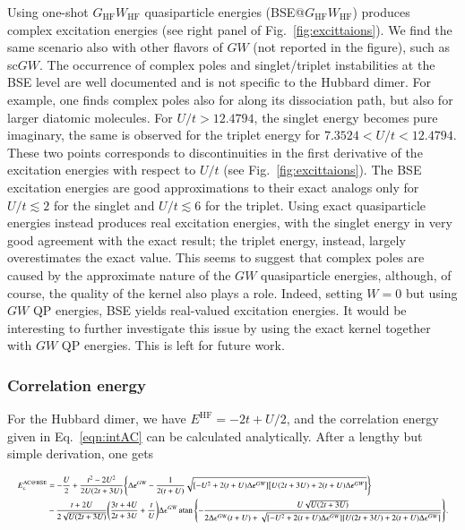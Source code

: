 \documentclass[aps,prb,reprint,superscriptaddress]{revtex4-1}
\makeatletter
\newcommand{\EHF}{E^\text{HF}}
\newcommand{\EcACBSE}{E_\text{c}^\text{AC@BSE}}
\newcommand{\eps}{\epsilon}
\makeatother
\begin{document}
Using one-shot $G_{\text{HF}}W_{\text{HF}}$ quasiparticle energies (BSE@$G_{\text{HF}}W_{\text{HF}}$) produces complex excitation energies (see right panel of Fig.~\ref{fig:excittaions}). We find the same scenario also with other flavors of $GW$ (not reported in the figure), such as sc$GW$.  The occurrence of complex poles and singlet/triplet instabilities at the BSE level are well documented \citep{Holzer_2018b,Blase_2020,Loos_2020e} and is not specific to the Hubbard dimer. For example, one finds complex poles also for  along its dissociation path, \citep{Li_2021a} but also for larger diatomic molecules. \citep{Loos_2020e}
For $U/t>12.4794$, the singlet energy becomes pure imaginary, the same is observed for the triplet energy for $7.3524<U/t<12.4794$. These two points corresponds to discontinuities in the first derivative of the excitation energies with respect to $U/t$ (see Fig.~\ref{fig:excittaions}).
The BSE excitation energies are good approximations to their exact analogs only for $U/t\lesssim 2$ for the singlet and $U/t\lesssim 6$ for the triplet.
Using exact quasiparticle energies instead produces real excitation energies, with the singlet energy in very good agreement with the exact result; the triplet energy, instead, largely overestimates the exact value. 
This seems to suggest that complex poles are caused by the approximate nature of the $GW$ quasiparticle energies, although, of course, the quality of the kernel also plays a role. Indeed, setting $W=0$ but using $GW$ QP energies, BSE yields real-valued excitation energies. It would be interesting to further investigate this issue by using the exact kernel together with $GW$ QP energies. This is left for future work.


\subsubsection{Correlation energy}
For the Hubbard dimer, we have $\EHF = -2t+U/2$, and the correlation energy given in Eq.~\eqref{eqn:intAC} can be calculated analytically. 
After a lengthy but simple derivation, one gets
\begin{widetext}
\begin{equation}
\resizebox{1\textwidth}{!}{$ \begin{split}
	\EcACBSE 
	& = - \frac{U}{2} 
	+ \frac{t^2-2U^2}{2U(2t+3U)} \qty{ \Delta\eps^{GW}-\frac{1}{2(t+U)}\sqrt{[-U^2+2(t+U)\Delta\eps^{GW}] \qty[U(2t+3U)+2(t+U)\Delta\eps^{GW}]} }\nonumber	\\
	& - \frac{t+2U}{2\sqrt{U(2t+3U)}} \qty( \frac{3t+4U}{2t+3U}+\frac{t}{U} ) \Delta\eps^{GW}
	\atan\qty{ -\frac{U\sqrt{U(2t+3U)}}{2\Delta\eps^{GW}(t+U)+\sqrt{[-U^2+2(t+U)\Delta\eps^{GW}][U(2t+3U)+2(t+U)\Delta\eps^{GW}]}}}.
	\end{split}$}
\label{eqn:EcanalAC}
  \end{equation}
  \end{widetext}
\end{document}
